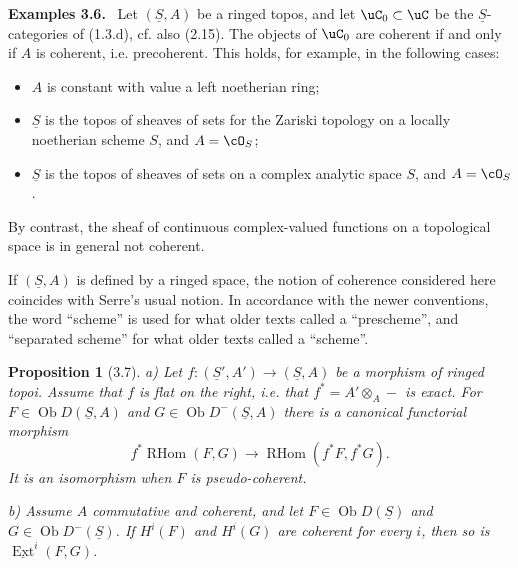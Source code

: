 \documentclass[11pt]{article}
\theoremstyle{plain}
\newtheorem*{proposition*}{Proposition}
\theoremstyle{definition}
\theoremstyle{remark}
\newenvironment{statement}[1]{\par\medskip\noindent\textbf{#1.}\ }{\par\medskip}
\DeclareMathOperator{\Ext}{Ext}
\DeclareMathOperator{\ob}{Ob}
\DeclareMathOperator{\RHom}{RHom}
\providecommand{\uS}{\underline{S}}
\begin{document}
\begin{statement}{Examples 3.6}
Let $(\uS,A)$ be a ringed topos, and let $\uC_0\subset\uC$ be the $\uS$-categories of (1.3.d), cf. also (2.15). The objects of $\uC_0$ are coherent if and only if $A$ is coherent, i.e. precoherent. This holds, for example, in the following cases:
\begin{itemize}
\item $A$ is constant with value a left noetherian ring;
\item $\uS$ is the topos of sheaves of sets for the Zariski topology on a locally noetherian scheme $S$, and $A=\cO_S$;
\item $\uS$ is the topos of sheaves of sets on a complex analytic space $S$, and $A=\cO_S$.
\end{itemize}
By contrast, the sheaf of continuous complex-valued functions on a topological space is in general not coherent.

If $(\uS,A)$ is defined by a ringed space, the notion of coherence considered here coincides with Serre's usual notion. In accordance with the newer conventions, the word ``scheme'' is used for what older texts called a ``prescheme'', and ``separated scheme'' for what older texts called a ``scheme''.
\end{statement}

\begin{proposition*}[3.7]
\textup{a)} Let $f:(\uS',A')\to(\uS,A)$ be a morphism of ringed topoi. Assume that $f$ is flat on the right, i.e. that $f^*=A'\otimes_A-$ is exact. For $F\in\ob D(\uS,A)$ and $G\in\ob D^-(\uS,A)$ there is a canonical functorial morphism
\[
f^*\RHom(F,G)\longrightarrow\RHom(f^*F,f^*G).
\]
It is an isomorphism when $F$ is pseudo-coherent.

\textup{b)} Assume $A$ commutative and coherent, and let $F\in\ob D(\uS)$ and $G\in\ob D^-(\uS)$. If $H^i(F)$ and $H^i(G)$ are coherent for every $i$, then so is $\underline{\Ext}^i(F,G)$.
\end{proposition*}
\end{document}

